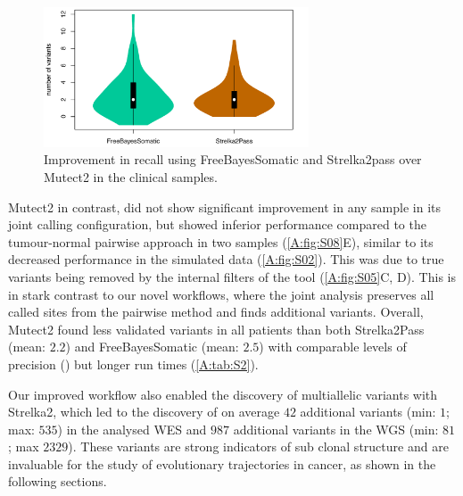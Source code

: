 \begin{figure}[!ht]
\centering
  \includegraphics[width=0.7\textwidth]{Appendices/Variantcalling/supp/S10}
  \caption{Improvement in recall using FreeBayesSomatic and Strelka2pass over Mu\-tect2 in the clinical samples.}\label{A:fig:S10}
\end{figure}


Mutect2 in contrast, did not show significant improvement in any sample in its joint calling configuration, but showed inferior performance compared to the tumour-normal pairwise approach in two samples (\autoref{A:fig:S08}E), similar to its decreased performance in the simulated data (\autoref{A:fig:S02}). This was due to true variants being removed by the internal filters of the tool (\autoref{A:fig:S05}C, D). This is in stark contrast to our novel workflows, where the joint analysis preserves all called sites from the pairwise method and finds additional variants. Overall, Mutect2 found less validated variants in all patients than both Strelka2Pass (mean: $2.2$) and FreeBayesSomatic (mean: $2.5$) with comparable levels of precision () but longer run times (\autoref{A:tab:S2}).


Our improved workflow also enabled the discovery of multiallelic variants with Strelka2, which led to the discovery of on average $42$ additional variants (min: $1$; max: $535$) in the analysed WES and $987$ additional variants in the WGS (min: $81$; max $2329$). These variants are strong indicators of sub clonal structure and are invaluable for the study of evolutionary trajectories in cancer, as shown in the following sections.


